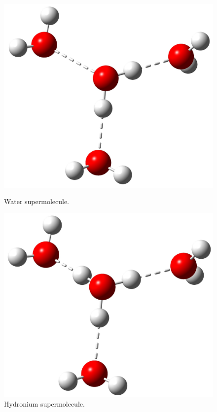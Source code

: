 \documentclass[twocolumn]{article}
\begin{document}
\begin{figure}[h!]
\begin{minipage}[b]{0.225\textwidth}
          \includegraphics[scale=0.07]{4water.jpg}
          \caption{Water supermolecule.}
        \end{minipage}
        \hfill
        \begin{minipage}[b]{0.225\textwidth}
          \centering
          \includegraphics[scale=0.08]{hidronio4waters.jpg}
          \caption{Hydronium supermolecule.}
        \end{minipage}
        \centering

\end{figure}
\end{document}
